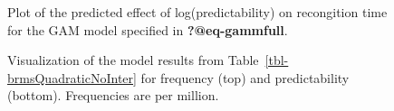 \documentclass[
  12pt,
  letterpaper,
]{scrreport}
\begin{document}
\begin{figure}[htbp]

\caption{\label{fig-gammodelinterplot}Plot of the predicted effect of
log(predictability) on recongition time for the GAM model specified in
\textbf{?@eq-gammfull}.}


\end{figure}%

\begin{figure}[htbp]

\caption{\label{fig-FullQuadraticPlot}Visualization of the model results
from Table~\ref{tbl-brmsQuadraticNoInter} for frequency (top) and
predictability (bottom). Frequencies are per million.}


\end{figure}%
\end{document}

